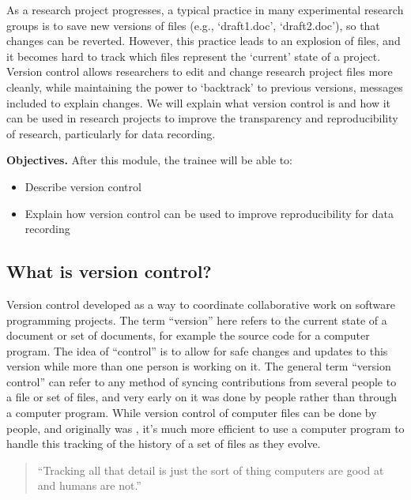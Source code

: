 \documentclass[]{tufte-book}
\providecommand{\tightlist}{%
  \setlength{\itemsep}{0pt}\setlength{\parskip}{0pt}}
\begin{document}
As a research project progresses, a typical practice in many experimental
research groups is to save new versions of files (e.g., `draft1.doc',
`draft2.doc'), so that changes can be reverted. However, this practice leads to
an explosion of files, and it becomes hard to track which files represent the
`current' state of a project. Version control allows researchers to edit and
change research project files more cleanly, while maintaining the power to
`backtrack' to previous versions, messages included to explain changes. We will
explain what version control is and how it can be used in research projects to
improve the transparency and reproducibility of research, particularly for data
recording.

\textbf{Objectives.} After this module, the trainee will be able to:

\begin{itemize}
\tightlist
\item
  Describe version control\\
\item
  Explain how version control can be used to improve reproducibility
  for data recording
\end{itemize}

\hypertarget{what-is-version-control}{%
\subsection{What is version control?}\label{what-is-version-control}}

Version control developed as a way to coordinate collaborative work on software
programming projects. The term ``version'' here refers to the current state of a
document or set of documents, for example the source code for a computer
program. The idea of ``control'' is to allow for safe changes and updates to this
version while more than one person is working on it. The general term ``version
control'' can refer to any method of syncing contributions from several people to
a file or set of files, and very early on it was done by people rather than
through a computer program. While version control of computer files can be done
by people, and originally was \citep{irving2011astonishments}, it's much more
efficient to use a computer program to handle this tracking of the history of a
set of files as they evolve.

\begin{quote}
``Tracking all that detail is just the sort of thing computers
are good at and humans are not.'' \citep{raymond2003art}
\end{quote}
\end{document}
